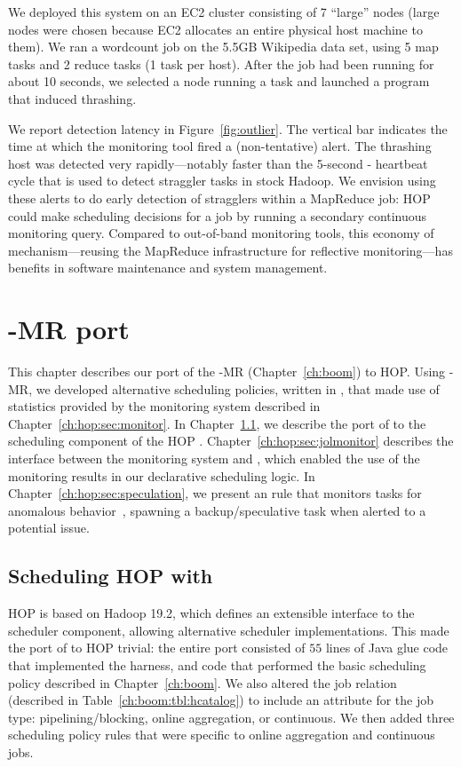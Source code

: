 We deployed this system on an EC2 cluster consisting of 7 ``large''
nodes (large nodes were chosen because EC2 allocates an entire
physical host machine to them). We ran a wordcount job on the 5.5GB Wikipedia
data set, using 5 map tasks and 2 reduce tasks (1 task per host). After
the job had been running for about 10 seconds, we selected a node
running a task and launched a program that induced thrashing.

We report detection latency in Figure~\ref{fig:outlier}. The vertical bar
indicates the time at which the monitoring tool fired a (non-tentative)
alert. The thrashing host was detected very rapidly---notably faster than the
5-second {\TT}-{\JT} heartbeat cycle that is used to detect straggler tasks in
stock Hadoop. We envision using these alerts to do early detection of stragglers
within a MapReduce job: HOP could make scheduling decisions for a job by running
a secondary continuous monitoring query. Compared to out-of-band monitoring
tools, this economy of mechanism---reusing the MapReduce infrastructure for
reflective monitoring---has benefits in software maintenance and system
management.

\section{\BOOM-MR port}
\label{ch:hop:sec:boom}

This chapter describes our port of the \BOOM-MR (Chapter~\ref{ch:boom}) to HOP.
Using \BOOM-MR, we developed alternative scheduling policies, written in
\OVERLOG, that made use of statistics provided by the monitoring system
described in Chapter~\ref{ch:hop:sec:monitor}.  In
Chapter~\ref{ch:hop:sec:jolport}, we describe the port of \JOL to the
scheduling component of the HOP \JT.  Chapter~\ref{ch:hop:sec:jolmonitor}
describes the interface between the monitoring system and \JOL, which enabled
the use of the monitoring results in our declarative scheduling logic.  In
Chapter~\ref{ch:hop:sec:speculation}, we present an \OVERLOG rule that monitors
tasks for anomalous behavior~\cite{hopdemo}, spawning a backup/speculative task
when alerted to a potential issue.

\subsection{Scheduling HOP with \JOL}
\label{ch:hop:sec:jolport}

HOP is based on Hadoop 19.2, which defines an extensible interface to the \JT
scheduler component, allowing alternative scheduler implementations.  This made
the port of \JOL to HOP trivial: the entire port consisted of $55$ lines of
Java glue code that implemented the \JOL harness, and \OVERLOG code that
performed the basic scheduling policy described in Chapter~\ref{ch:boom}.  We
also altered the job relation (described in Table~\ref{ch:boom:tbl:hcatalog})
to include an attribute for the job type: pipelining/blocking, online
aggregation, or continuous.  We then added three scheduling policy rules that
were specific to online aggregation and continuous jobs.

